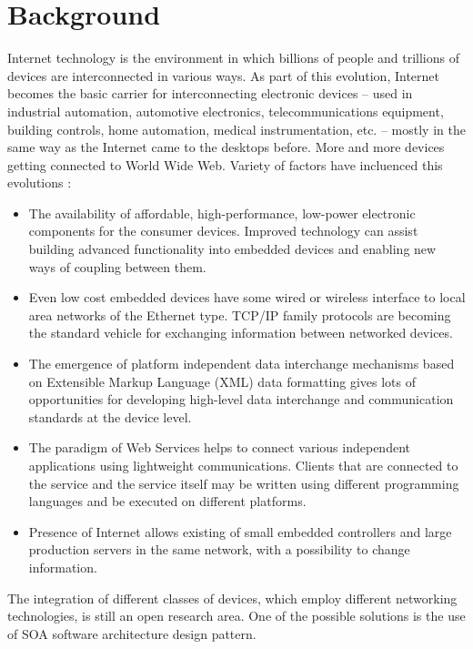 \newpage
\section{Background}

Internet technology is the environment in which billions of people and trillions of
devices are interconnected in various ways.
As part of this evolution, Internet becomes the basic carrier
for interconnecting electronic devices – used in industrial
automation, automotive electronics, telecommunications
equipment, building controls, home automation, medical
instrumentation, etc. – mostly in the same way as the Internet came
to the desktops before. More and more devices getting connected to World Wide
Web. Variety of factors have incluenced  this evolutions \cite{4221180}:
\begin{itemize}
\item The availability of affordable, high-performance, low-power
electronic components for the consumer devices. Improved technology can assist
building  advanced functionality into embedded devices and enabling new ways of
coupling between them.
\item Even low cost embedded devices have some wired or wireless interface to local area
networks of the Ethernet type. TCP/IP family protocols are becoming the standard
vehicle for exchanging information between networked devices.
\item The emergence of platform independent data interchange mechanisms based on
Extensible Markup Language (XML) data formatting gives lots of opportunities for developing high-level data interchange and
communication standards at the device level.
\item The paradigm of Web Services  helps to connect various
independent applications using lightweight communications. Clients that are
connected to the service and the service itself may be written using different
programming languages and be executed on different platforms.
\item Presence of Internet allows existing of small embedded controllers and
large production servers in the same network, with a possibility to change
information.
\end{itemize}


The integration of different classes of devices, which employ different
networking technologies, is still an open research area. One of the possible
solutions is the use of SOA software architecture design pattern.



